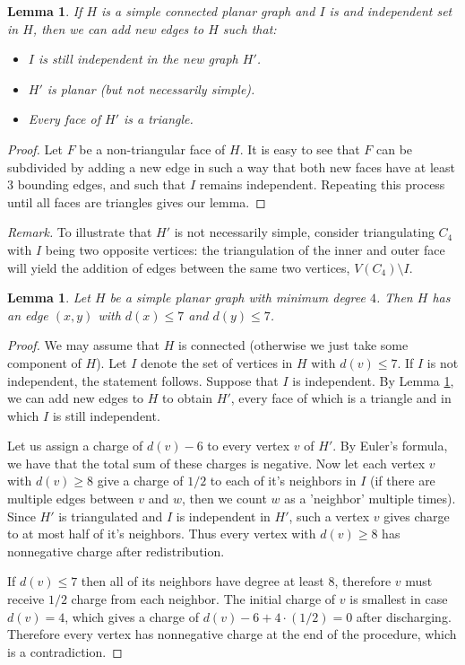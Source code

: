 \documentclass[a4paper, 12pt]{article}
\newtheorem{lemma}[theorem]{Lemma}
\begin{document}
\begin{lemma}\label{lem:triangulate}
    If $H$ is a simple connected planar graph and $I$ is and independent set in $H$, then we can add new edges to $H$ such that:
    \begin{itemize}
        \item $I$ is still independent in the new graph $H'$.
        \item $H'$ is planar (but not necessarily simple).
        \item Every face of $H'$ is a triangle.
    \end{itemize}
\end{lemma}
\begin{proof}

    Let $F$ be a non-triangular face of $H$. It is easy to see that $F$ can be subdivided by adding a new edge in such a way that both new faces have at least 3 bounding edges, and such that $I$ remains independent. Repeating this process until all faces are triangles gives our lemma.
\end{proof}
\emph{Remark.} To illustrate that $H'$ is not necessarily simple, consider triangulating $C_4$ with $I$ being two opposite vertices: the triangulation of the inner and outer face will yield the addition of edges between the same two vertices, $V(C_4)\setminus I$.

\begin{lemma}\label{lem:discharge}
    Let $H$ be a simple planar graph with minimum degree $4$. Then $H$ has an edge $(x, y)$ with $d(x) \leq 7$ and $d(y) \leq 7$.
\end{lemma}

\begin{proof}
    We may assume that $H$ is connected (otherwise we just take some component of $H$).
    Let $I$ denote the set of vertices in $H$ with $d(v) \leq 7$. If $I$ is not independent, the statement follows. Suppose that $I$ is independent. By Lemma \ref{lem:triangulate}, we can add new edges to $H$ to obtain $H'$, every face of which is a triangle and in which $I$ is still independent.

    Let us assign a charge of $d(v) - 6$ to every vertex $v$ of $H'$. By Euler's formula, we have that the total sum of these charges is negative. 
    Now let each vertex $v$ with $d(v) \geq 8$ give a charge of $1/2$ to each of it's neighbors in $I$ (if there are multiple edges between $v$ and $w$, then we count $w$ as a 'neighbor' multiple times). Since $H'$ is triangulated and $I$ is independent in $H'$, such a vertex $v$ gives charge to at most half of it's neighbors. Thus every vertex with $d(v) \geq 8$ has nonnegative charge after redistribution.

    If $d(v) \leq 7$ then all of its neighbors have degree at least $8$, therefore $v$ must receive $1/2$ charge from each neighbor. The initial charge of $v$ is smallest in case $d(v) = 4$, which gives a charge of $d(v)-6 + 4\cdot(1/2) = 0$ after discharging. Therefore every vertex has nonnegative charge at the end of the procedure, which is a contradiction. 
\end{proof}
\end{document}
